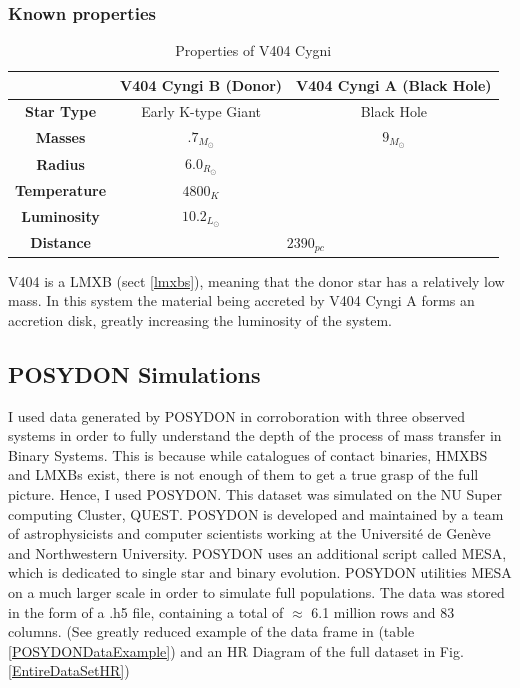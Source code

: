 \documentclass[12pt, letterpaper]{article}
\begin{document}
        \subsubsection{Known properties}
        \begin{table}
            \begin{center} 
                \begin{tabular}{||c | c c||} 
                 \hline
                 & \textbf{V404 Cyngi B (Donor)} & \textbf{V404 Cyngi A (Black Hole)} \\ 
                 \hline\hline
                 \textbf{Star Type} & Early K-type Giant & Black Hole \\ 
                 \hline
                 \textbf{Masses}& $.7_{M_\odot}$ \cite{Bernardini_2016} & $9_{M_\odot}$ \cite{Shahbaz_1994} \\
                 \hline
                 \textbf{Radius} & $6.0_{R_\odot}$ \cite{Shahbaz_1994} &  \\
                 \hline
                 \textbf{Temperature} & $4800_K$ \cite{Shahbaz_1994} & \\
                 \hline
                 \textbf{Luminosity} & $10.2_{L_\odot}$ \cite{Shahbaz_1994} &  \\ 
                 \hline
                 \textbf{Distance} & \multicolumn{2}{c||}{$2390_{pc}$ \cite{Bernardini_2016}} \\
                 \hline
            \end{tabular}
            \caption{Properties of V404 Cygni} 
            \label{V404Data} 
            \end{center}
        \end{table}

        V404 is a LMXB (sect \ref{lmxbs}), meaning that the donor star has a relatively low mass. In this system the material being accreted by V404 Cyngi A forms an accretion disk, greatly increasing the luminosity of the system.

    \subsection{POSYDON Simulations}
         I used data generated by POSYDON \cite{Fragos_2023} in corroboration with three observed systems in order to fully understand the depth of the process of mass transfer in Binary Systems. This is because while catalogues of contact binaries, HMXBS and LMXBs exist, there is not enough of them to get a true grasp of the full picture. Hence, I used POSYDON. This dataset was simulated on the NU Super computing Cluster, QUEST. POSYDON is developed and maintained by a team of astrophysicists and computer scientists working at the Université de Genève and Northwestern University. POSYDON uses an additional script called MESA, which is dedicated to single star and binary evolution. POSYDON utilities MESA on a much larger scale in order to simulate full populations. The data was stored in the form of a .h5 file, containing a total of $\approx$ 6.1 million rows and 83 columns. (See greatly reduced example of the data frame in (table \ref{POSYDONDataExample}) and an HR Diagram of the full dataset in Fig. \ref{EntireDataSetHR})
\end{document}
